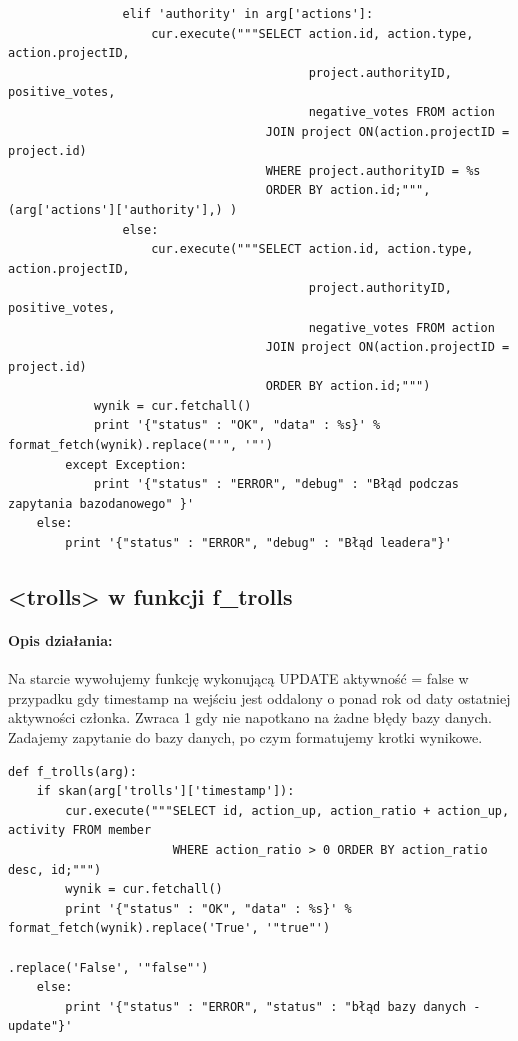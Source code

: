 \documentclass{article}
\begin{document}
\begin{verbatim}
                elif 'authority' in arg['actions']:
                    cur.execute("""SELECT action.id, action.type, action.projectID,
                                          project.authorityID, positive_votes,
                                          negative_votes FROM action
                                    JOIN project ON(action.projectID = project.id)
                                    WHERE project.authorityID = %s
                                    ORDER BY action.id;""", (arg['actions']['authority'],) )
                else:
                    cur.execute("""SELECT action.id, action.type, action.projectID,
                                          project.authorityID, positive_votes,
                                          negative_votes FROM action
                                    JOIN project ON(action.projectID = project.id)
                                    ORDER BY action.id;""")
            wynik = cur.fetchall()
            print '{"status" : "OK", "data" : %s}' % format_fetch(wynik).replace("'", '"')
        except Exception:
            print '{"status" : "ERROR", "debug" : "Błąd podczas zapytania bazodanowego" }' 
    else:
        print '{"status" : "ERROR", "debug" : "Błąd leadera"}'   
\end{verbatim}









\newpage
\subsection{<trolls> w funkcji f\_trolls }
\paragraph{Opis działania: }
Na starcie wywołujemy funkcję wykonującą UPDATE aktywność = false w\,przypadku gdy timestamp na wejściu jest oddalony o ponad rok od daty ostatniej aktywności członka. Zwraca 1 gdy nie napotkano na żadne błędy bazy danych. Zadajemy zapytanie do bazy danych, po czym formatujemy krotki wynikowe.
\begin{verbatim}
def f_trolls(arg):
    if skan(arg['trolls']['timestamp']):                                                  
        cur.execute("""SELECT id, action_up, action_ratio + action_up, activity FROM member
                       WHERE action_ratio > 0 ORDER BY action_ratio desc, id;""")
        wynik = cur.fetchall()
        print '{"status" : "OK", "data" : %s}' % format_fetch(wynik).replace('True', '"true"')
                                                                    .replace('False', '"false"')    
    else:
        print '{"status" : "ERROR", "status" : "błąd bazy danych - update"}' 
\end{verbatim}
\end{document}
